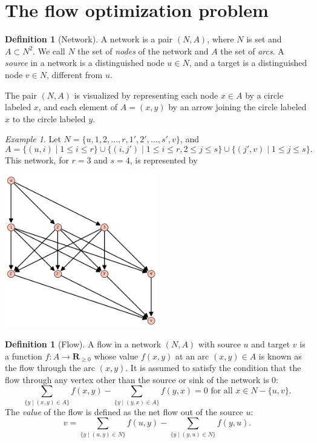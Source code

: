 \documentclass{amsbook}
\newcommand{\RR}{\mathbf R}
\theoremstyle{definition}
\newtheorem{definition}[theorem]{Definition}
\theoremstyle{remark}
\newtheorem{example}[theorem]{Example}
\begin{document}
\section{The flow optimization problem}
\label{sec:flow-optim-probl}
\begin{definition}[Network]
  A network is a pair $(N,A)$, where $N$ is set and $A\subset N^2$.
  We call $N$ the set of \emph{nodes} of the network and $A$ the set of \emph{arcs}.
  A \emph{source} in a network is a distinguished node $u\in N$, and a target is a distinguished node $v\in N$, different from $u$.
\end{definition}
The pair $(N,A)$ is visualized by representing each node $x\in A$ by a circle labeled $x$, and each element of $A=(x,y)$ by an arrow joining the circle labeled $x$ to the circle labeled $y$.
\begin{example}
  Let $N=\{u,1,2,\dotsc,r,1',2',\dotsc,s',v\}$, and
  \begin{displaymath}
    A = \{(u,i)\mid 1\leq i\leq r\}\cup\{(i,j')\mid 1\leq i\leq r,2\leq j\leq s\}\cup\{(j',v)\mid 1\leq j\leq s\}.
  \end{displaymath}
  This network, for $r=3$ and $s=4$, is represented by
  \begin{center}
    \includegraphics[width=0.5\textwidth]{transportation_network.png}  
  \end{center}
\end{example}
\begin{definition}
  [Flow]
  A flow in a network $(N,A)$ with source $u$ and target $v$ is a function $f:A\to \RR_{\geq 0}$ whose value $f(x,y)$ at an arc $(x,y)\in A$ is known as the flow through the arc $(x,y)$.
  It is assumed to satisfy the condition that the flow through any vertex other than the source or sink of the network is $0$:
  \begin{equation}
    \label{eq:net-zero}
    \tag{*}
    \sum_{\{y\mid (x,y)\in A\}}f(x,y) - \sum_{\{y\mid (y,x)\in A\}} f(y,x) = 0 \text{ for all } x\in N-\{u,v\}.
  \end{equation}
  The \emph{value} of the flow is defined as the net flow out of the source $u$:
  \begin{displaymath}
    v = \sum_{\{y\mid (u,y)\in N\}} f(u,y) - \sum_{\{y\mid (y,u)\in N\}} f(y,u).
  \end{displaymath}
\end{definition}
\end{document}
